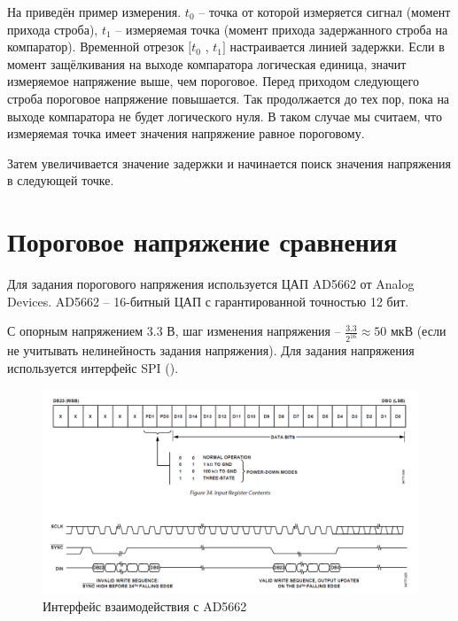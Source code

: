 На  приведён пример измерения. 
$ t_{0} $ -- точка от которой измеряется сигнал (момент прихода строба),
$ t_{1} $ -- измеряемая точка (момент прихода задержанного строба на компаратор).
Временной отрезок $ [t_{0}$ , $ t_{1}] $  настраивается линией задержки.
Если в момент защёлкивания на выходе компаратора логическая единица, значит измеряемое напряжение выше,
чем пороговое. Перед приходом следующего строба пороговое напряжение повышается.
Так продолжается до тех пор, пока на выходе компаратора не будет логического нуля.
В таком случае мы считаем, что измеряемая точка имеет значения напряжение равное пороговому.

Затем увеличивается значение задержки и начинается поиск значения напряжения в следующей точке.

\section{Пороговое напряжение сравнения}

Для задания порогового напряжения используется ЦАП AD5662 от Analog Devices.
AD5662 -- 16-битный ЦАП с гарантированной точностью 12 бит.

С опорным напряжением 3.3 В, шаг изменения напряжения -- $ \frac{3.3}{2^{16}} \approx 50 $ мкВ (если не учитывать нелинейность задания напряжения).
Для задания напряжения используется интерфейс SPI ().

\FloatBarrier

\begin{figure}[ht!] 
	\center
	\includegraphics [scale=0.5] {my_folder/images//dac_interface}
	\caption{Интерфейс взаимодействия с AD5662} 
	\label{fig:dac-interface}  
\end{figure}

\FloatBarrier


